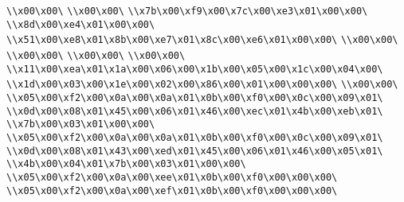 \verb|\\x00\x00\|\newline
\verb|\\x00\x00\|\newline
\verb|\\x7b\x00\xf9\x00\x7c\x00\xe3\x01\x00\x00\|\newline
\verb|\\x8d\x00\xe4\x01\x00\x00\|\newline
\verb|\\x51\x00\xe8\x01\x8b\x00\xe7\x01\x8c\x00\xe6\x01\x00\x00\|\newline
\verb|\\x00\x00\|\newline
\verb|\\x00\x00\|\newline
\verb|\\x00\x00\|\newline
\verb|\\x00\x00\|\newline
\verb|\\x11\x00\xea\x01\x1a\x00\x06\x00\x1b\x00\x05\x00\x1c\x00\x04\x00\|\newline
\verb|\\x1d\x00\x03\x00\x1e\x00\x02\x00\x86\x00\x01\x00\x00\x00\|\newline
\verb|\\x00\x00\|\newline
\verb|\\x05\x00\xf2\x00\x0a\x00\x0a\x01\x0b\x00\xf0\x00\x0c\x00\x09\x01\|\newline
\verb|\\x0d\x00\x08\x01\x45\x00\x06\x01\x46\x00\xec\x01\x4b\x00\xeb\x01\|\newline
\verb|\\x7b\x00\x03\x01\x00\x00\|\newline
\verb|\\x05\x00\xf2\x00\x0a\x00\x0a\x01\x0b\x00\xf0\x00\x0c\x00\x09\x01\|\newline
\verb|\\x0d\x00\x08\x01\x43\x00\xed\x01\x45\x00\x06\x01\x46\x00\x05\x01\|\newline
\verb|\\x4b\x00\x04\x01\x7b\x00\x03\x01\x00\x00\|\newline
\verb|\\x05\x00\xf2\x00\x0a\x00\xee\x01\x0b\x00\xf0\x00\x00\x00\|\newline
\verb|\\x05\x00\xf2\x00\x0a\x00\xef\x01\x0b\x00\xf0\x00\x00\x00\|\newline
